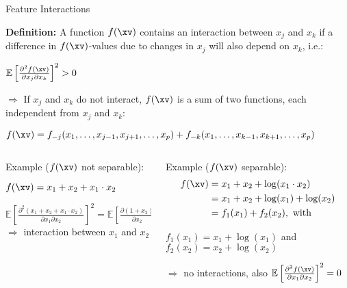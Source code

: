 \documentclass[11pt,compress,t,notes=noshow, aspectratio=169, xcolor=table]{beamer}
\begin{document}
\begin{frame}{Feature Interactions }

\textbf{Definition:} A function $f(\xv)$ contains an interaction between $x_j$ and $x_k$ if a difference in $f(\xv)$-values due to changes in $x_j$ will also depend on $x_k$, i.e.: %
\medskip
\centerline{$\mathbb{E} \left[ \frac{\partial^2 f(\xv)}{\partial x_j \partial x_k} \right]^2 > 0$}
\medskip
$\Rightarrow$ If $x_j$ and $x_k$ do not interact, $f(\xv)$ is a sum of two functions, each independent from $x_j$ and $x_k$:

\medskip

\centerline{$f(\xv) = f_{-j}(x_1, \ldots, x_{j-1}, x_{j+1}, \ldots, x_p) + f_{-k}(x_1, \ldots, x_{k-1}, x_{k+1}, \ldots, x_p)$}

\medskip\pause

\begin{columns}[T, totalwidth=\textwidth]
\begin{column}{0.5\textwidth}
Example ($f(\xv)$ not separable):
\medskip

\centerline{$f(\xv) = x_1 + x_2 + x_1 \cdot x_2$}
\medskip
$\mathbb{E} \left[ \tfrac{\partial^2 (x_1 + x_2 + x_1 \cdot x_2)}{\partial x_1 \partial x_2} \right]^2 = \mathbb{E} \left[ \tfrac{\partial (1 + x_2)}{\partial x_2} \right]^2 = 1 > 0$\\
\medskip
$\Rightarrow$ interaction between $x_1$ and $x_2$ 
\end{column}
\pause
\begin{column}{0.5\textwidth}
Example ($f(\xv)$ separable):
\setlength{\abovedisplayskip}{0pt}
\setlength{\belowdisplayskip}{0pt}
\setlength{\abovedisplayshortskip}{0pt}
\setlength{\belowdisplayshortskip}{0pt}
\medskip
\begin{align*}
	f(\xv) &= x_1 + x_2 + \log(x_1 \cdot x_2)\\
	       &= x_1 + x_2 + \log(x_1) + \log(x_2)\\
	       &= f_1(x_1) + f_2(x_2), \text{ with }
\end{align*}

\medskip

$f_1(x_1) = x_1 + \log(x_1)$ and $f_2(x_2) = x_2 + \log(x_2)$

\medskip

$\Rightarrow$ no interactions, also $\mathbb{E} \left[ \tfrac{\partial^2 f(\xv)}{\partial x_1 \partial x_2} \right]^2 = 0$
\end{column} 
\end{columns}

\end{frame}
\end{document}
